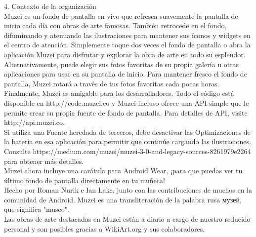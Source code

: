 \documentclass[12pt,a4paper]{article}
\begin{document}
4.	Contexto de la organización\\
Muzei es un fondo de pantalla en vivo que refresca suavemente la pantalla de inicio cada día con obras de arte famosas. También retrocede en el fondo, difuminando y atenuando las ilustraciones para mantener sus íconos y widgets en el centro de atención. Simplemente toque dos veces el fondo de pantalla o abra la aplicación Muzei para disfrutar y explorar la obra de arte en todo su esplendor.\\

Alternativamente, puede elegir sus fotos favoritas de su propia galería u otras aplicaciones para usar en su pantalla de inicio. Para mantener fresco el fondo de pantalla, Muzei rotará a través de tus fotos favoritas cada pocas horas.\\

Finalmente, Muzei es amigable para los desarrolladores. Todo el código está disponible en http://code.muzei.co y Muzei incluso ofrece una API simple que le permite crear su propia fuente de fondo de pantalla. Para detalles de API, visite http://api.muzei.co.\\

Si utiliza una Fuente heredada de terceros, debe desactivar las Optimizaciones de la batería en esa aplicación para permitir que continúe cargando las ilustraciones. Consulte https://medium.com/muzei/muzei-3-0-and-legacy-sources-8261979e2264 para obtener más detalles.\\


Muzei ahora incluye una carátula para Android Wear, ¡para que puedas ver tu último fondo de pantalla directamente en tu muñeca!\\


Hecho por Roman Nurik e Ian Lake, junto con las contribuciones de muchos en la comunidad de Android. Muzei es una transliteración de la palabra rusa музей, que significa "museo".\\

Las obras de arte destacadas en Muzei están a diario a cargo de nuestro reducido personal y son posibles gracias a WikiArt.org y sus colaboradores.\\
\end{document}
